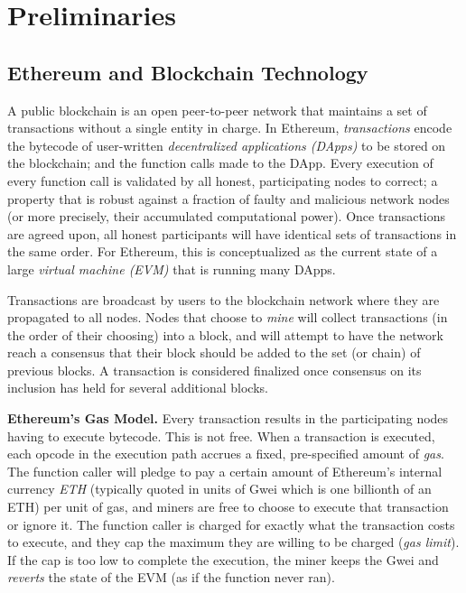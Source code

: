 
\section{Preliminaries}

\subsection{Ethereum and Blockchain Technology}

A public blockchain is an open peer-to-peer network that maintains a set of transactions without a single entity in charge. In Ethereum, \emph{transactions} encode the bytecode of user-written \emph{decentralized applications (DApps)} to be stored on the blockchain; and the function calls made to the DApp. Every execution of every function call is validated by all honest, participating nodes to correct; a property that is robust against a fraction of faulty and malicious network nodes (or more precisely, their accumulated computational power). Once transactions are agreed upon, all honest participants will have identical sets of transactions in the same order. For Ethereum, this is conceptualized as the current state of a large \emph{virtual machine (EVM)} that is running many DApps. 

Transactions are broadcast by users to the blockchain network where they are propagated to all nodes. Nodes that choose to \emph{mine} will collect transactions (in the order of their choosing) into a block, and will attempt to have the network reach a consensus that their block should be added to the set (or chain) of previous blocks. A transaction is considered finalized once consensus on its inclusion has held for several additional blocks.

\textbf{Ethereum's Gas Model.} Every transaction results in the participating nodes having to execute bytecode. This is not free. When a transaction is executed, each opcode in the execution path accrues a fixed, pre-specified amount of \emph{gas}. The function caller will pledge to pay a certain amount of Ethereum's internal currency \emph{ETH} (typically quoted in units of Gwei which is one billionth of an ETH) per unit of gas, and miners are free to choose to execute that transaction or ignore it. The function caller is charged for exactly what the transaction costs to execute, and they cap the maximum they are willing to be charged (\textit{gas limit}). If the cap is too low to complete the execution, the miner keeps the Gwei and \emph{reverts} the state of the EVM (as if the function never ran).

